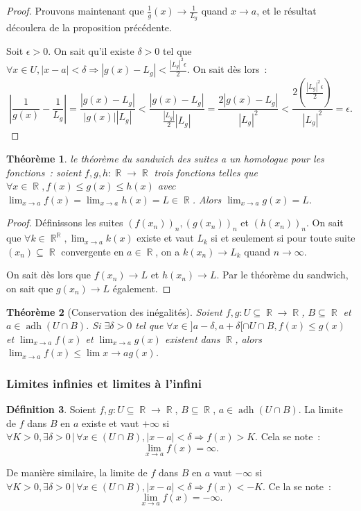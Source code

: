 \documentclass{article}
\DeclareMathOperator{\R}{\mathbb R}
\DeclareMathOperator{\adh}{adh}
\newtheorem{thm}{Théorème}[section]
\theoremstyle{definition}
\newtheorem{déf}[thm]{Définition}
\theoremstyle{remark}
\begin{document}
\begin{proof}
			Prouvons maintenant que $\frac 1g(x) \to \frac 1{L_g}$ quand $x \to a$, et le résultat découlera de la proposition précédente.
			
			Soit $\epsilon > 0$. On sait qu'il existe $\delta > 0$ tel que $\forall x \in U, |x-a| < \delta \Rightarrow |g(x) - L_g| < \frac {|L_g|^2\epsilon}2$.
			On sait dès lors~:
			\[\left|\frac 1{g(x)} - \frac 1{L_g}\right| = \frac {|g(x)-L_g|}{|g(x)||L_g|} < \frac {|g(x)-L_g|}{\frac {|L_g|}{2}|L_g|}
			  = \frac {2|g(x)-L_g|}{|L_g|^2} < \frac {2(\frac {|L_g|^2\epsilon}{2})}{|L_g|^2} = \epsilon.\]
			
			\end{proof}
			  
			\begin{thm} le théorème du sandwich des suites a un homologue pour les fonctions~: soient $f, g, h : \R \to \R$ trois fonctions telles que
			$\forall x \in \R, f(x) \leq g(x) \leq h(x)$ avec $\lim_{x \to a}f(x) = \lim_{x \to a}h(x) = L \in \R$. Alors $\lim_{x \to a}g(x) = L$.
			\end{thm}
			
			\begin{proof} Définissons les suites $(f(x_n))_n, (g(x_n))_n$ et $(h(x_n))_n$. On sait que $\forall k \in {\R}^{\R}, \lim_{x \to a}k(x)$ existe
			et vaut $L_k$ si et seulement si pour toute suite $(x_n) \subseteq \R$ convergente en $a \in \R$, on a $k(x_n) \to L_k$ quand $n \to \infty$.
			
			On sait dès lors que $f(x_n) \to L$ et $h(x_n) \to L$. Par le théorème du sandwich, on sait que $g(x_n) \to L$ également. \end{proof}
			
			\begin{thm}[Conservation des inégalités] Soient $f, g : U \subseteq \R \to \R$, $B \subseteq \R$ et $a \in \adh(U \cap B)$.
			Si $\exists \delta > 0$ tel que $\forall x \in ]a-\delta, a+\delta[ \cap U \cap B, f(x) \leq g(x)$ et $\lim_{x \to a}f(x)$ et $\lim_{x \to a}g(x)$
			existent dans $\R$, alors $\lim_{x \to a}f(x) \leq \lim{x \to a}g(x)$. \end{thm}
			
		\subsubsection{Limites infinies et limites à l'infini}
			
			\begin{déf} Soient $f, g : U \subseteq \R \to \R$, $B \subseteq \R$, $a \in \adh(U \cap B)$. La limite de $f$ dans $B$ en $a$ existe et vaut
			$+\infty$ si $\forall K > 0, \exists \delta > 0 \, | \, \forall x \in (U \cap B), |x-a| < \delta \Rightarrow f(x) > K$. Cela se note~:
			\[\lim_{x \to a}f(x) = \infty.\]
			
			De manière similaire, la limite de $f$ dans $B$ en $a$ vaut $-\infty$ si $\forall K > 0, \exists \delta > 0 \, | \, \forall x \in (U \cap B), |x-a| <
			\delta \Rightarrow f(x) < -K$.
			Ce la se note~:
			\[\lim_{x \to a}f(x) = -\infty.\]
			\end{déf}
\end{document}
